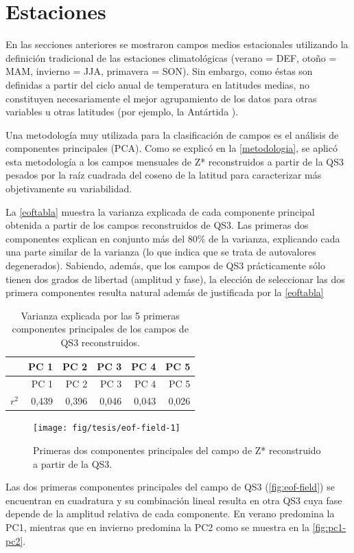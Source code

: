 \documentclass[spanish,a4paper,12pt,oneside]{book}
\begin{document}
\hypertarget{estaciones}{%
\section{Estaciones}\label{estaciones}}

En las secciones anteriores se mostraron campos medios estacionales
utilizando la definición tradicional de las estaciones climatológicas
(verano = DEF, otoño = MAM, invierno = JJA, primavera = SON). Sin
embargo, como éstas son definidas a partir del ciclo anual de
temperatura en latitudes medias, no constituyen necesariamente el mejor
agrupamiento de los datos para otras variables u otras latitudes (por
ejemplo, la Antártida \citep{King1997}).

Una metodología muy utilizada para la clasificación de campos es el
análisis de componentes principales (PCA). Como se explicó en la
\autoref{metodologia}, se aplicó esta metodología a los campos mensuales
de Z* reconstruidos a partir de la QS3 pesados por la raíz cuadrada del
coseno de la latitud para caracterizar más objetivamente su
variabilidad.

La \autoref{eoftabla} muestra la varianza explicada de cada componente
principal obtenida a partir de los campos reconstruidos de QS3. Las
primeras dos componentes explican en conjunto más del 80\% de la
varianza, explicando cada una parte similar de la varianza (lo que
indica que se trata de autovalores degenerados). Sabiendo, además, que
los campos de QS3 prácticamente sólo tienen dos grados de libertad
(amplitud y fase), la elección de seleccionar las dos primera
componentes resulta natural además de justificada por la
\autoref{eoftabla}

\begin{longtable}[]{@{}lrrrrr@{}}
\caption{Varianza explicada por las 5 primeras componentes principales
de los campos de QS3 reconstruidos.\label{eoftabla}}\tabularnewline
\toprule
& PC 1 & PC 2 & PC 3 & PC 4 & PC 5\tabularnewline
\midrule
\endfirsthead
\toprule
& PC 1 & PC 2 & PC 3 & PC 4 & PC 5\tabularnewline
\midrule
\endhead
\(r^2\) & 0,439 & 0,396 & 0,046 & 0,043 & 0,026\tabularnewline
\bottomrule
\end{longtable}

\begin{figure}
\texttt{[image: fig/tesis/eof-field-1]} \caption{Primeras dos componentes principales del campo de Z* reconstruido a partir de la QS3.}\label{fig:eof-field}
\end{figure}

Las dos primeras componentes principales del campo de QS3
(\autoref{fig:eof-field}) se encuentran en cuadratura y su combinación
lineal resulta en otra QS3 cuya fase depende de la amplitud relativa de
cada componente. En verano predomina la PC1, mientras que en invierno
predomina la PC2 como se muestra en la \autoref{fig:pc1-pc2}.
\end{document}
